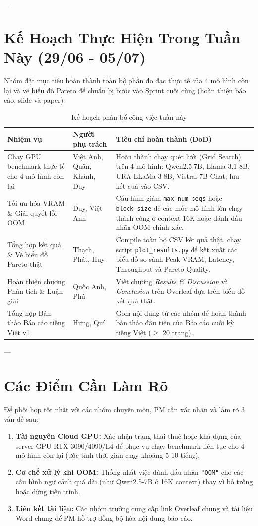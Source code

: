 \documentclass[a4paper,12pt]{article}
\begin{document}
---

\section{Kế Hoạch Thực Hiện Trong Tuần Này (29/06 - 05/07)}
Nhóm đặt mục tiêu hoàn thành toàn bộ phần đo đạc thực tế của 4 mô hình còn lại và vẽ biểu đồ Pareto để chuẩn bị bước vào Sprint cuối cùng (hoàn thiện báo cáo, slide và paper).

\begin{table}[h!]
\centering
\caption{Kế hoạch phân bổ công việc tuần này}
\vspace{0.2cm}
\begin{tabular}{p{3.5cm}p{3cm}p{8cm}}
\toprule
\textbf{Nhiệm vụ} & \textbf{Người phụ trách} & \textbf{Tiêu chí hoàn thành (DoD)} \\
\midrule
Chạy GPU benchmark thực tế cho 4 mô hình còn lại & Việt Anh, Quân, Khánh, Duy & Hoàn thành chạy quét lưới (Grid Search) trên 4 mô hình: Qwen2.5-7B, Llama-3.1-8B, URA-LLaMa-3-8B, Vistral-7B-Chat; lưu kết quả vào CSV. \\
\midrule
Tối ưu hóa VRAM \& Giải quyết lỗi OOM & Duy, Việt Anh & Cấu hình giảm \texttt{max\_num\_seqs} hoặc \texttt{block\_size} để các mốc mô hình lớn chạy thành công ở context 16K hoặc đánh dấu nhãn OOM chính xác. \\
\midrule
Tổng hợp kết quả \& Vẽ biểu đồ Pareto thật & Thạch, Phát, Huy & Compile toàn bộ CSV kết quả thật, chạy script \texttt{plot\_results.py} để kết xuất các biểu đồ so sánh Peak VRAM, Latency, Throughput và Pareto Quality. \\
\midrule
Hoàn thiện chương Phân tích \& Luận giải & Quốc Anh, Phú & Viết chương \textit{Results \& Discussion} và \textit{Conclusion} trên Overleaf dựa trên biểu đồ kết quả thật. \\
\midrule
Tổng hợp Bản thảo Báo cáo tiếng Việt v1 & Hưng, Quí & Gom nội dung từ các nhóm để hoàn thành bản thảo đầu tiên của Báo cáo cuối kỳ tiếng Việt ($\ge$ 20 trang). \\
\bottomrule
\end{tabular}
\end{table}

---

\section{Các Điểm Cần Làm Rõ}
Để phối hợp tốt nhất với các nhóm chuyên môn, PM cần xác nhận và làm rõ 3 vấn đề sau:
\begin{enumerate}
    \item \textbf{Tài nguyên Cloud GPU:} Xác nhận trạng thái thuê hoặc khả dụng của server GPU RTX 3090/4090/L4 để phục vụ chạy benchmark liên tục cho 4 mô hình còn lại (ước tính thời gian chạy khoảng 5-10 tiếng).
    \item \textbf{Cơ chế xử lý khi OOM:} Thống nhất việc đánh dấu nhãn \texttt{"OOM"} cho các cấu hình ngữ cảnh quá dài (như Qwen2.5-7B ở 16K context) thay vì bỏ trống hoặc dừng tiến trình.
    \item \textbf{Liên kết tài liệu:} Các nhóm trưởng cung cấp link Overleaf chung và tài liệu Word chung để PM hỗ trợ đồng bộ hóa nội dung báo cáo.
\end{enumerate}
\end{document}

